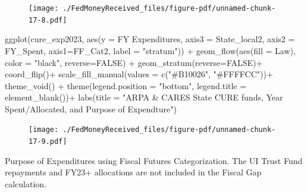 \documentclass[
  letterpaper,
  DIV=11,
  numbers=noendperiod]{scrreport}
\newenvironment{Shaded}{\begin{snugshade}}{\end{snugshade}}
\newcommand{\AttributeTok}[1]{\textcolor[rgb]{0.40,0.45,0.13}{#1}}
\newcommand{\ConstantTok}[1]{\textcolor[rgb]{0.56,0.35,0.01}{#1}}
\newcommand{\FunctionTok}[1]{\textcolor[rgb]{0.28,0.35,0.67}{#1}}
\newcommand{\NormalTok}[1]{\textcolor[rgb]{0.00,0.23,0.31}{#1}}
\newcommand{\SpecialCharTok}[1]{\textcolor[rgb]{0.37,0.37,0.37}{#1}}
\newcommand{\StringTok}[1]{\textcolor[rgb]{0.13,0.47,0.30}{#1}}
\begin{document}
\begin{figure}[H]

{\centering \texttt{[image: ./FedMoneyReceived\_files/figure-pdf/unnamed-chunk-17-8.pdf]}

}

\end{figure}

\begin{Shaded}
\begin{Highlighting}[]
 \FunctionTok{ggplot}\NormalTok{(cure\_exp2023, }
       \FunctionTok{aes}\NormalTok{(}\AttributeTok{y =} \StringTok{\textasciigrave{}}\AttributeTok{FY Expenditures}\StringTok{\textasciigrave{}}\NormalTok{, }
           \AttributeTok{axis3 =} \StringTok{\textasciigrave{}}\AttributeTok{State\_local2}\StringTok{\textasciigrave{}}\NormalTok{, }\AttributeTok{axis2 =}\NormalTok{ FY\_Spent, }
           \AttributeTok{axis1=}\NormalTok{FF\_Cat2, }\AttributeTok{label =} \StringTok{"stratum"}\NormalTok{)) }\SpecialCharTok{+}
  \FunctionTok{geom\_flow}\NormalTok{(}\FunctionTok{aes}\NormalTok{(}\AttributeTok{fill =}\NormalTok{ Law), }\AttributeTok{color =} \StringTok{"black"}\NormalTok{, }\AttributeTok{reverse=}\ConstantTok{FALSE}\NormalTok{) }\SpecialCharTok{+}
  \FunctionTok{geom\_stratum}\NormalTok{(}\AttributeTok{reverse=}\ConstantTok{FALSE}\NormalTok{)}\SpecialCharTok{+}
  \FunctionTok{coord\_flip}\NormalTok{()}\SpecialCharTok{+}
  \FunctionTok{scale\_fill\_manual}\NormalTok{(}\AttributeTok{values =} \FunctionTok{c}\NormalTok{(}\StringTok{"\#B10026"}\NormalTok{, }\StringTok{"\#FFFFCC"}\NormalTok{))}\SpecialCharTok{+}
  \FunctionTok{theme\_void}\NormalTok{() }\SpecialCharTok{+} 
      \FunctionTok{theme}\NormalTok{(}\AttributeTok{legend.position =} \StringTok{"bottom"}\NormalTok{, }\AttributeTok{legend.title =} \FunctionTok{element\_blank}\NormalTok{())}\SpecialCharTok{+}
  \FunctionTok{labs}\NormalTok{(}\AttributeTok{title =} \StringTok{"ARPA \& CARES State CURE funds, Year Spent/Allocated, and Purpose of Expendture"}\NormalTok{)}
\end{Highlighting}
\end{Shaded}

\begin{figure}[H]

{\centering \texttt{[image: ./FedMoneyReceived\_files/figure-pdf/unnamed-chunk-17-9.pdf]}

}

\end{figure}

Purpose of Expenditures using Fiscal Futures Categorization. The UI
Trust Fund repayments and FY23+ allocations are not included in the
Fiscal Gap calculation.
\end{document}
